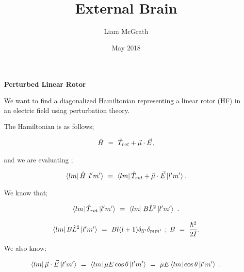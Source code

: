 \documentclass{article}
\title{External Brain}
\author{Liam McGrath}
\date{May 2018}
\begin{document}
\textbf{Perturbed Linear Rotor}

We want to find a diagonalized Hamiltonian representing a linear rotor (HF) in an electric field using perturbation theory. 

The Hamiltonian is as follows;

\begin{equation} \label{eq:252}
\hat{H} \hspace{0.125cm} = \hspace{0.125cm} \hat{T}_{rot} + \vec\mu\cdot\vec{E} \hspace{0.0125cm} , 
\end{equation}

and we are evaluating ; 

\begin{equation} \label{eq:253}
\bra{l m}\hat{H}\ket{l' m'} \hspace{0.125cm} = \hspace{0.125cm} \bra{l m} \hat{T}_{rot} + \vec\mu\cdot\vec{E}\ket{l' m'} . 
\end{equation}

We know that;

\begin{equation} \label{eq:254}
\bra{l m}\hat{T}_{rot}\ket{l' m'} \hspace{0.125cm} = \hspace{0.125cm} \bra{l m}B\hat{L}^{2}\ket{l' m'} \hspace{0.125cm} .
\end{equation}

\begin{equation} \label{eq:255}
\bra{l m}B\hat{L}^{2}\ket{l' m'} \hspace{0.125cm} = \hspace{0.125cm} Bl(l+1) \delta_{l l'}\delta_{m m'} \hspace{0.125cm} ; \hspace{0.125cm} B \hspace{0.125cm} = \hspace{0.125cm} \frac{\hbar^{2}}{2I} .
\end{equation}

We also know;

\begin{equation} \label{eq:256}
\bra{l m}\vec{\mu}\cdot\vec{E}\ket{l' m'} \hspace{0.125cm} = \hspace{0.125cm} \bra{l m}\mu E\cos\theta\ket{l' m'} \hspace{0.125cm} = \hspace{0.125cm} \mu E\bra{l m}\cos\theta\ket{l' m'} \hspace{0.125cm}.
\end{equation}
\end{document}
